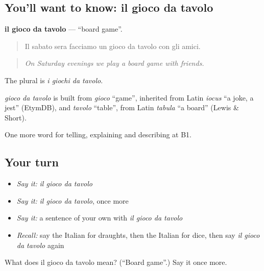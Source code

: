 \subsection*{You'll want to know: il gioco da tavolo}
\textbf{il gioco da tavolo} — \textquotedblleft{}board game\textquotedblright{}.

\begin{quote}
Il sabato sera facciamo un gioco da tavolo con gli amici.
\end{quote}

\begin{quote}
\emph{On Saturday evenings we play a board game with friends.}
\end{quote}

The plural is \emph{i giochi da tavolo}.

\begin{cousinweb}
\emph{gioco da tavolo} is built from \emph{gioco} \textquotedblleft{}game\textquotedblright{}, inherited from Latin \emph{iocus} \textquotedblleft{}a joke, a jest\textquotedblright{} (EtymDB), and \emph{tavolo} \textquotedblleft{}table\textquotedblright{}, from Latin \emph{tabula} \textquotedblleft{}a board\textquotedblright{} (Lewis \& Short).
\end{cousinweb}

\begin{grammarlens}[title={What you've built}]
One more word for telling, explaining and describing at B1.
\end{grammarlens}

\subsection*{Your turn}
\begin{itemize}
\raggedright
  \item \emph{Say it:} \emph{il gioco da tavolo}
  \item \emph{Say it:} \emph{il gioco da tavolo}, once more
  \item \emph{Say it:} a sentence of your own with \emph{il gioco da tavolo}
  \item \emph{Recall:} say the Italian for draughts, then the Italian for dice, then say \emph{il gioco da tavolo} again
\end{itemize}

\begin{tcolorbox}[breakable,colback=teal!4,colframe=teal!35!black,title={Before you move on}]
What does il gioco da tavolo mean? (\textquotedblleft{}Board game\textquotedblright{}.) Say it once more.
\end{tcolorbox}
